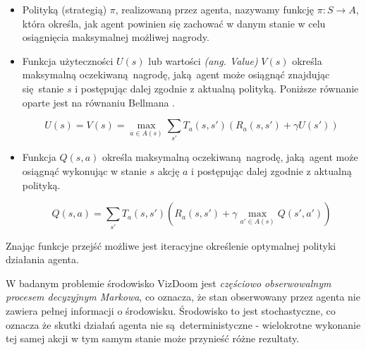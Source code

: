 \begin{itemize}
\item Polityką (strategią) $\pi$, realizowaną przez agenta, nazywamy funkcję $ \pi: S \rightarrow A$, która określa, jak agent powinien się zachować w danym stanie w celu osiągnięcia maksymalnej możliwej nagrody.
\item Funkcja użyteczności $U(s)$ lub wartości \textit{(ang. Value)} $V(s)$ określa maksymalną oczekiwaną nagrodę, jaką agent może osiągnąć znajdując się stanie $s$ i postępując dalej zgodnie z aktualną polityką. Poniższe równanie oparte jest na równaniu Bellmana \cite{bellman1954}.

$$U(s) = V(s) = \max_{a \in A(s)} \sum_{s'} T_a(s,s')(R_a(s,s') + \gamma U(s'))$$
\item Funkcja $Q(s,a)$ określa maksymalną oczekiwaną nagrodę, jaką agent może osiągnąć wykonując w stanie $s$ akcję $a$ i postępując dalej zgodnie z aktualną polityką.

$$Q(s,a) = \sum_{s'} T_a(s,s')(R_a(s,s') + \gamma \max_{a' \in A(s)}Q(s',a'))$$

\end{itemize}

\vspace{5mm}

Znając funkcje przejść możliwe jest iteracyjne określenie optymalnej polityki działania agenta. 

W badanym problemie środowisko VizDoom jest \textit{częściowo obserwowalnym procesem decyzyjnym Markowa}, co oznacza, że stan obserwowany przez agenta nie zawiera pełnej informacji o środowisku. Środowisko to jest stochastyczne, co oznacza że skutki działań agenta nie są deterministyczne - wielokrotne wykonanie tej samej akcji w tym samym stanie może przynieść różne rezultaty.
